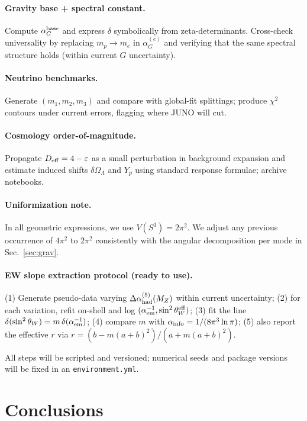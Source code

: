 \documentclass{article}
\numberwithin{equation}{section}
\theoremstyle{plain}
\theoremstyle{definition}
\theoremstyle{remark}
\begin{document}
\paragraph{Gravity base + spectral constant.}
Compute $\alpha_G^{\rm base}$ and express $\delta$ symbolically from zeta-determinants. Cross-check universality by replacing $m_p\to m_e$ in $\alpha_G^{(e)}$ and verifying that the same spectral structure holds (within current $G$ uncertainty).

\paragraph{Neutrino benchmarks.}
Generate $(m_1,m_2,m_3)$ and compare with global-fit splittings; produce $\chi^2$ contours under current errors, flagging where JUNO will cut.

\paragraph{Cosmology order-of-magnitude.}
Propagate $D_{\rm eff}=4-\varepsilon$ as a small perturbation in background expansion and estimate induced shifts $\delta\Omega_\Lambda$ and $Y_p$ using standard response formulae; archive notebooks.

\paragraph{Uniformization note.}
In all geometric expressions, we use $V(S^3)=2\pi^2$. We adjust any previous occurrence of $4\pi^2$ to $2\pi^2$ consistently with the angular decomposition per mode in Sec.~\ref{sec:grav}.

\paragraph{EW slope extraction protocol (ready to use).}
(1) Generate pseudo-data varying $\Delta\alpha^{(5)}_{\rm had}(M_Z)$ within current uncertainty; 
(2) for each variation, refit on-shell and log $(\alpha_{\rm em}^{-1},\sin^2\theta_W^{\rm eff})$; 
(3) fit the line $\delta(\sin^2\theta_W)=m\,\delta(\alpha_{\rm em}^{-1})$; 
(4) compare $m$ with $\alpha_{\rm info}=1/(8\pi^3\ln\pi)$; 
(5) also report the effective $r$ via $r=(b - m(a+b)^2)/(a+m(a+b)^2)$.

All steps will be scripted and versioned; numerical seeds and package versions will be fixed in an \texttt{environment.yml}.

\section{Conclusions}
\label{sec:conclusions}
\end{document}

